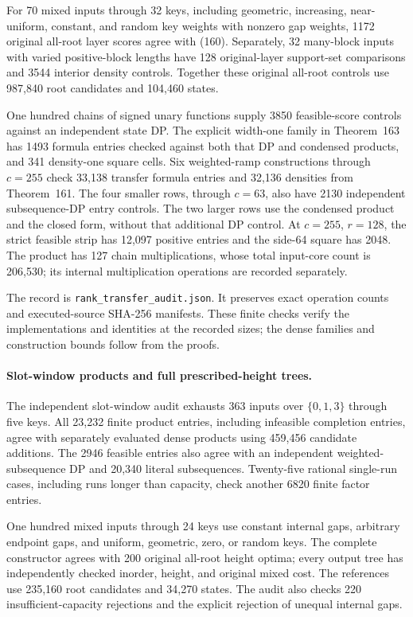 \documentclass[11pt]{article}
\begin{document}
For 70 mixed inputs through 32 keys, including geometric, increasing,
near-uniform, constant, and random key weights with nonzero gap weights,
1172 original all-root layer scores agree with
(160). Separately, 32 many-block inputs with varied
positive-block lengths have 128 original-layer support-set comparisons and
3544 interior density controls. Together these original all-root controls
use 987,840 root candidates and 104,460 states.

One hundred chains of signed unary functions supply 3850 feasible-score
controls against an independent state DP. The explicit width-one family
in Theorem~163 has 1493 formula entries checked
against both that DP and condensed products, and 341 density-one square
cells. Six weighted-ramp constructions through $c=255$ check 33,138
transfer formula entries and 32,136 densities from
Theorem~161. The four smaller rows, through
$c=63$, also have 2130 independent subsequence-DP entry controls. The two
larger rows use the condensed product and the closed form, without that
additional DP control. At $c=255$, $r=128$, the strict feasible strip has
12,097 positive entries and the side-64 square has 2048. The product
has 127 chain multiplications, whose total input-core count is 206,530;
its internal multiplication operations are recorded separately.

The record is \texttt{rank\_transfer\_audit.json}. It preserves exact
operation counts and executed-source SHA-256 manifests. These finite
checks verify the implementations and identities at the recorded sizes;
the dense families and construction bounds follow from the proofs.


\paragraph{Slot-window products and full prescribed-height trees.}
The independent slot-window audit exhausts 363 inputs over $\{0,1,3\}$
through five keys. All 23,232 finite product entries, including infeasible
completion entries, agree with separately evaluated dense products using
459,456 candidate additions. The 2946 feasible entries also agree with an
independent weighted-subsequence DP and 20,340 literal subsequences.
Twenty-five rational single-run cases, including runs longer than capacity,
check another 6820 finite factor entries.

One hundred mixed inputs through 24 keys use constant internal gaps,
arbitrary endpoint gaps, and uniform, geometric, zero, or random keys.
The complete constructor agrees with 200 original all-root height optima;
every output tree has independently checked inorder, height, and original
mixed cost. The references use 235,160 root candidates and 34,270 states.
The audit also checks 220 insufficient-capacity rejections and the explicit
rejection of unequal internal gaps.
\end{document}
